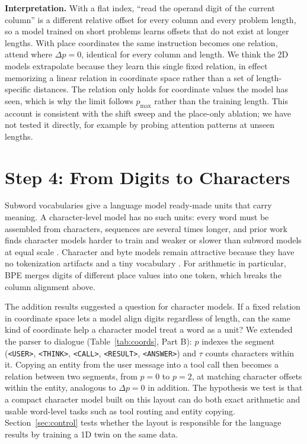 \documentclass[10pt,twocolumn]{article}
\begin{document}
\textbf{Interpretation.} With a flat index, ``read the operand digit of the current column'' is a different relative offset for every column and every problem length, so a model trained on short problems learns offsets that do not exist at longer lengths. With place coordinates the same instruction becomes one relation, attend where $\Delta p = 0$, identical for every column and length. We think the 2D models extrapolate because they learn this single fixed relation, in effect memorizing a linear relation in coordinate space rather than a set of length-specific distances. The relation only holds for coordinate values the model has seen, which is why the limit follows $p_{\max}$ rather than the training length. This account is consistent with the shift sweep and the place-only ablation; we have not tested it directly, for example by probing attention patterns at unseen lengths.

\section{Step 4: From Digits to Characters}\label{sec:step4}

Subword vocabularies give a language model ready-made units that carry meaning. A character-level model has no such units: every word must be assembled from characters, sequences are several times longer, and prior work finds character models harder to train and weaker or slower than subword models at equal scale \cite{alrfou2019character,libovicky2022why,mielke2021between}. Character and byte models remain attractive because they have no tokenization artifacts and a tiny vocabulary \cite{xue2022byt5,clark2022canine,pagnoni2024byte,shaham2021neural}. For arithmetic in particular, BPE merges digits of different place values into one token, which breaks the column alignment above.

The addition results suggested a question for character models. If a fixed relation in coordinate space lets a model align digits regardless of length, can the same kind of coordinate help a character model treat a word as a unit? We extended the parser to dialogue (Table~\ref{tab:coords}, Part B): $p$ indexes the segment (\texttt{<USER>}, \texttt{<THINK>}, \texttt{<CALL>}, \texttt{<RESULT>}, \texttt{<ANSWER>}) and $\tau$ counts characters within it. Copying an entity from the user message into a tool call then becomes a relation between two segments, from $p=0$ to $p=2$, at matching character offsets within the entity, analogous to $\Delta p=0$ in addition. The hypothesis we test is that a compact character model built on this layout can do both exact arithmetic and usable word-level tasks such as tool routing and entity copying. Section~\ref{sec:control} tests whether the layout is responsible for the language results by training a 1D twin on the same data.
\end{document}
